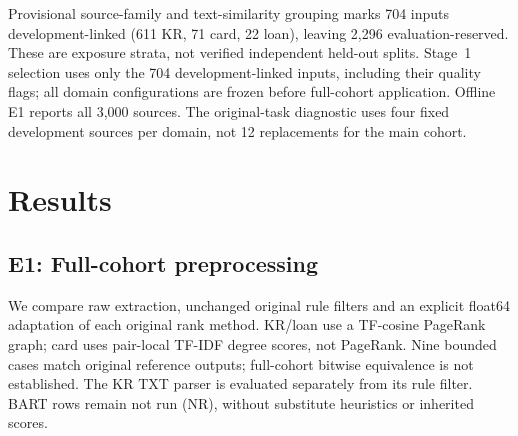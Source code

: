 \documentclass[11pt]{article}
\begin{document}
Provisional source-family and text-similarity grouping marks 704 inputs
development-linked (611 KR, 71 card, 22 loan), leaving 2,296
evaluation-reserved. These are exposure strata, not verified independent
held-out splits. Stage~1 selection uses only the 704 development-linked
inputs, including their quality flags; all domain configurations are frozen
before full-cohort application. Offline E1 reports all 3,000 sources.
The original-task diagnostic uses four fixed development sources per domain,
not 12 replacements for the main cohort.

\section{Results}
\subsection{E1: Full-cohort preprocessing}
\label{sec:exp-e1}
We compare raw extraction, unchanged original rule filters and an explicit
float64 adaptation of each original rank method. KR/loan use a TF-cosine
PageRank graph; card uses pair-local TF-IDF degree scores, not PageRank.
Nine bounded cases match original reference outputs; full-cohort bitwise
equivalence is not established. The KR TXT parser is evaluated separately
from its rule filter. BART rows remain not run (NR), without substitute
heuristics or inherited scores.
\end{document}

